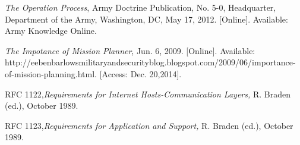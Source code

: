\documentclass[conference]{IEEEtran}
\begin{document}
 \begin{thebibliography}{1}

   {\em The Operation Process}, Army Doctrine Publication, No. 5-0, Headquarter, Department of the Army, Washington, DC, May 17, 2012. [Online]. Available: Army Knowledge Online.

   {\em The Impotance of Mission Planner}, Jun. 6, 2009. [Online]. Available: http://eebenbarlowsmilitaryandsecurityblog.blogspot.com/2009/06/importance-of-mission-planning.html. [Access: Dec. 20,2014].
  
   RFC 1122,{\em Requirements for Internet Hosts-Communication Layers,} R. Braden (ed.), October 1989.
  
   RFC 1123,{\em Requirements for Application and Support,} R. Braden (ed.), October 1989.
  
  
\end{thebibliography}
\end{document}
